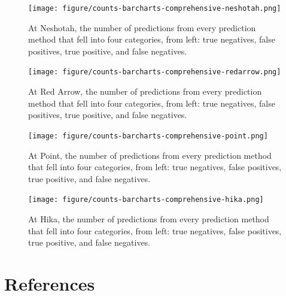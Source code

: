 \begin{figure}[htbp]
\centering
\texttt{[image: figure/counts-barcharts-comprehensive-neshotah.png]}
\caption{At Neshotah, the number of predictions from every prediction
method that fell into four categories, from left: true negatives, false
positives, true positive, and false negatives.}
\end{figure}

\begin{figure}[htbp]
\centering
\texttt{[image: figure/counts-barcharts-comprehensive-redarrow.png]}
\caption{At Red Arrow, the number of predictions from every prediction
method that fell into four categories, from left: true negatives, false
positives, true positive, and false negatives.}
\end{figure}

\begin{figure}[htbp]
\centering
\texttt{[image: figure/counts-barcharts-comprehensive-point.png]}
\caption{At Point, the number of predictions from every prediction
method that fell into four categories, from left: true negatives, false
positives, true positive, and false negatives.}
\end{figure}

\begin{figure}[htbp]
\centering
\texttt{[image: figure/counts-barcharts-comprehensive-hika.png]}
\caption{At Hika, the number of predictions from every prediction method
that fell into four categories, from left: true negatives, false
positives, true positive, and false negatives.}
\end{figure}

 


 
 

\section{References}\label{references}
